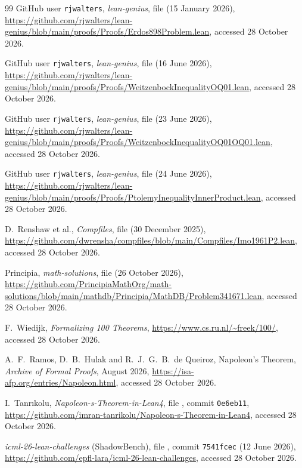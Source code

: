 \documentclass[11pt]{article}
\theoremstyle{definition}
\theoremstyle{remark}
\begin{document}
\begin{thebibliography}{99}
GitHub user \texttt{rjwalters}, \emph{lean-genius}, file 
(15 January 2026),
\url{https://github.com/rjwalters/lean-genius/blob/main/proofs/Proofs/Erdos898Problem.lean},
accessed 28 October 2026.

GitHub user \texttt{rjwalters}, \emph{lean-genius}, file
 (16 June 2026),
\url{https://github.com/rjwalters/lean-genius/blob/main/proofs/Proofs/WeitzenbockInequalityOQ01.lean},
accessed 28 October 2026.

GitHub user \texttt{rjwalters}, \emph{lean-genius}, file
 (23 June 2026),
\url{https://github.com/rjwalters/lean-genius/blob/main/proofs/Proofs/WeitzenbockInequalityOQ01OQ01.lean},
accessed 28 October 2026.

GitHub user \texttt{rjwalters}, \emph{lean-genius}, file
 (24 June 2026),
\url{https://github.com/rjwalters/lean-genius/blob/main/proofs/Proofs/PtolemyInequalityInnerProduct.lean},
accessed 28 October 2026.

D.~Renshaw et al., \emph{Compfiles}, file  (30 December 2025),
\url{https://github.com/dwrensha/compfiles/blob/main/Compfiles/Imo1961P2.lean}, accessed 28 October 2026.

Principia, \emph{math-solutions}, file 
(26 October 2026),
\url{https://github.com/PrincipiaMathOrg/math-solutions/blob/main/mathdb/Principia/MathDB/Problem341671.lean},
accessed 28 October 2026.

F.~Wiedijk, \emph{Formalizing 100 Theorems}, \url{https://www.cs.ru.nl/~freek/100/}, accessed 28 October 2026.

A.~F.~Ramos, D.~B.~Hulak and R.~J.~G.~B.~de Queiroz, Napoleon's Theorem, \emph{Archive of Formal
Proofs}, August 2026, \url{https://isa-afp.org/entries/Napoleon.html}, accessed 28 October 2026.

I.~Tanr\i{}kolu, \emph{Napoleon-s-Theorem-in-Lean4}, file , commit
\texttt{0e6eb11}, \url{https://github.com/imran-tanrikolu/Napoleon-s-Theorem-in-Lean4}, accessed
28 October 2026.

\emph{icml-26-lean-challenges} (ShadowBench), file
, commit
\texttt{7541fcec} (12 June 2026), \url{https://github.com/epfl-lara/icml-26-lean-challenges}, accessed
28 October 2026.


\end{thebibliography}
\end{document}
